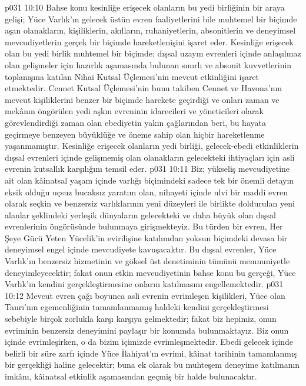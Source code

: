 \vs p031 10:10 Bahse konu kesinliğe erişecek olanların bu yedi birliğinin bir araya gelişi; Yüce Varlık’ın gelecek üstün evren faaliyetlerini bile muhtemel bir biçimde aşan olanakların, kişiliklerin, akılların, ruhaniyetlerin, absonitlerin ve deneyimsel mevcudiyetlerin gerçek bir biçimde hareketlenişini işaret eder. Kesinliğe erişecek olan bu yedi birlik muhtemel bir biçimde; dışsal uzayın evrenleri içinde anlaşılmaz olan gelişmeler için hazırlık aşamasında bulunan sınırlı ve absonit kuvvetlerinin toplanışına katılan Nihai Kutsal Üçlemesi’nin mevcut etkinliğini işaret etmektedir. Cennet Kutsal Üçlemesi’nin bunu takiben Cennet ve Havona’nın mevcut kişiliklerini benzer bir biçimde harekete geçirdiği ve onları zaman ve mekânın öngörülen yedi aşkın evreninin idarecileri ve yöneticileri olarak görevlendirdiği zaman olan ebediyetin yakın çağlarından beri, bu hayata geçirmeye benzeyen büyüklüğe ve öneme sahip olan hiçbir hareketlenme yaşanmamıştır. Kesinliğe erişecek olanların yedi birliği, gelecek\hyp{}ebedi etkinliklerin dışsal evrenleri içinde gelişmemiş olan olanakların gelecekteki ihtiyaçları için asli evrenin kutsallık karşılığını temsil eder.
\vs p031 10:11 Biz; yükseliş mevcudiyetine ait olan kâinatsal yaşam içinde  varlığı biçimindeki sadece tek bir önemli detayın eksik olduğu uçsuz bucaksız yaratım olan, nihayeti içinde ulvi bir maddi evren olarak seçkin ve benzersiz varlıklarının yeni düzeyleri ile birlikte doldurulan yeni alanlar şeklindeki yerleşik dünyaların gelecekteki ve daha büyük olan dışsal evrenlerinin öngörüsünde bulunmaya girişmekteyiz. Bu türden bir evren, Her Şeye Gücü Yeten Yücelik’in evirilişine katılımdan yoksun biçimdeki devasa bir deneyimsel engel içinde mevcudiyete kavuşacaktır. Bu dışsal evrenler, Yüce Varlık’ın benzersiz hizmetinin ve göksel üst denetiminin tümünü memnuniyetle deneyimleyecektir; fakat onun etkin mevcudiyetinin bahse konu bu gerçeği, Yüce Varlık’ın kendini gerçekleştirmesine onların katılmasını engellemektedir.
\vs p031 10:12 Mevcut evren çağı boyunca asli evrenin evrimleşen kişilikleri, Yüce olan Tanrı’nın egemenliğinin tamamlanmamış haldeki kendini gerçekleştirmesi sebebiyle birçok zorlukla karşı karşıya gelmektedir; fakat biz hepimiz, onun evriminin benzersiz deneyimini paylaşır bir konumda bulunmaktayız. Biz onun içinde evrimleşirken, o da bizim içimizde evrimleşmektedir. Ebedi gelecek içinde belirli bir süre zarfı içinde Yüce İlahiyat’ın evrimi, kâinat tarihinin tamamlanmış bir gerçekliği haline gelecektir; buna ek olarak bu muhteşem deneyime katılmanın imkânı, kâinatsal etkinlik aşamasından geçmiş bir halde bulunacaktır.
